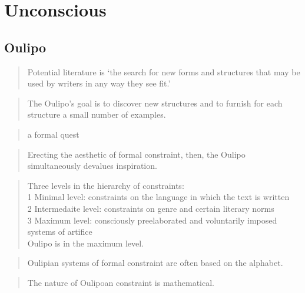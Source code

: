 \section{Unconscious}


\subsection{Oulipo}


\begin{quotation}
  Potential literature is `the search for new forms and structures that may be used by writers in any way they see fit.' 
\end{quotation}

\begin{quotation}
  The Oulipo's goal is to discover new structures and to furnish for each structure a small number of examples. 
\end{quotation}

\begin{quotation}
  a formal quest 
\end{quotation}

\begin{quotation}
  Erecting the aesthetic of formal constraint, then, the Oulipo simultaneously devalues inspiration. 
\end{quotation}

\begin{quotation}
  Three levels in the hierarchy of constraints:\\1 Minimal level: constraints on the language in which the text is written\\2 Intermedaite level: constraints on genre and certain literary norms\\3 Maximum level: consciously preelaborated and voluntarily imposed systems of artifice\\Oulipo is in the maximum level. 
\end{quotation}

\begin{quotation}
  Oulipian systems of formal constraint are often based on the alphabet. 
\end{quotation}

\begin{quotation}
  The nature of Oulipoan constraint is mathematical. 
\end{quotation}

